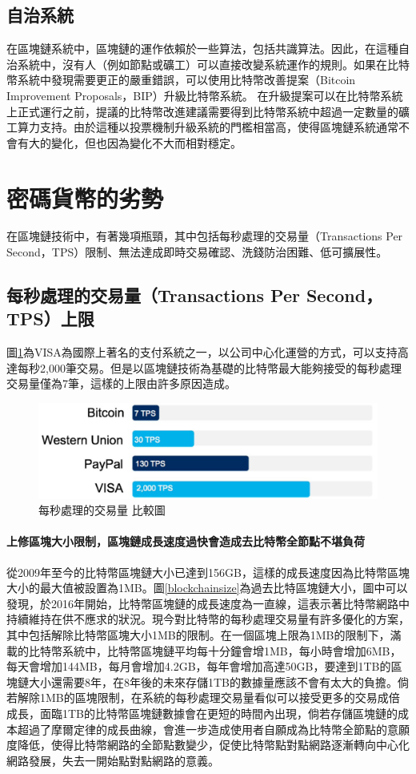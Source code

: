 		\subsection{自治系統}
		在區塊鏈系統中，區塊鏈的運作依賴於一些算法，包括共識算法。因此，在這種自治系統中，沒有人（例如節點或礦工）可以直接改變系統運作的規則。如果在比特幣系統中發現需要更正的嚴重錯誤，可以使用比特幣改善提案（Bitcoin Improvement Proposals，BIP）升級比特幣系統。 在升級提案可以在比特幣系統上正式運行之前，提議的比特幣改進建議需要得到比特幣系統中超過一定數量的礦工算力支持。由於這種以投票機制升級系統的門檻相當高，使得區塊鏈系統通常不會有大的變化，但也因為變化不大而相對穩定。

	\section{密碼貨幣的劣勢}
	在區塊鏈技術中，有著幾項瓶頸，其中包括每秒處理的交易量（Transactions Per Second，TPS）限制、無法達成即時交易確認、洗錢防治困難、低可擴展性。

		\subsection{每秒處理的交易量（Transactions Per Second，TPS）上限}
		圖\ref{TPS}為VISA為國際上著名的支付系統之一，以公司中心化運營的方式，可以支持高達每秒2,000筆交易。但是以區塊鏈技術為基礎的比特幣最大能夠接受的每秒處理交易量僅為7筆，這樣的上限由許多原因造成。

			\begin{figure}[h]
				\centering
				\includegraphics[width = .7\textwidth]{TPS.png}
				\caption{每秒處理的交易量 比較圖\supercite{TPS}}\label{TPS}
			\end{figure}

			\paragraph{上修區塊大小限制，區塊鏈成長速度過快會造成去比特幣全節點不堪負荷}
			從2009年至今的比特幣區塊鏈大小已達到156GB，這樣的成長速度因為比特幣區塊大小的最大值被設置為1MB。圖\ref{blockchainsize}為過去比特區塊鏈大小，圖中可以發現，於2016年開始，比特幣區塊鏈的成長速度為一直線，這表示著比特幣網路中持續維持在供不應求的狀況。現今對比特幣的每秒處理交易量有許多優化的方案，其中包括解除比特幣區塊大小1MB的限制。在一個區塊上限為1MB的限制下，滿載的比特幣系統中，比特幣區塊鏈平均每十分鐘會增1MB，每小時會增加6MB，每天會增加144MB，每月會增加4.2GB，每年會增加高達50GB，要達到1TB的區塊鏈大小還需要8年，在8年後的未來存儲1TB的數據量應該不會有太大的負擔。倘若解除1MB的區塊限制，在系統的每秒處理交易量看似可以接受更多的交易成倍成長，面臨1TB的比特幣區塊鏈數據會在更短的時間內出現，倘若存儲區塊鏈的成本超過了摩爾定律的成長曲線，會進一步造成使用者自願成為比特幣全節點的意願度降低，使得比特幣網路的全節點數變少，促使比特幣點對點網路逐漸轉向中心化網路發展，失去一開始點對點網路的意義。

